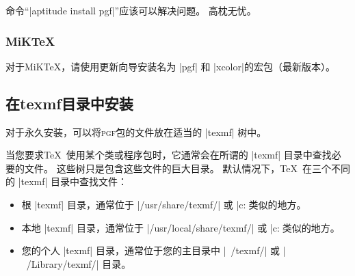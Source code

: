 命令``|aptitude install pgf|''应该可以解决问题。 高枕无忧。


\subsubsection{MiKTeX}


对于MiK\TeX，请使用更新向导安装名为 |pgf| 和 |xcolor|的宏包（最新版本）。

\subsection{在texmf目录中安装}


对于永久安装，可以将\textsc{pgf}包的文件放在适当的 |texmf| 树中。


当您要求\TeX\ 使用某个类或程序包时，它通常会在所谓的 |texmf| 目录中查找必要的文件。 这些树只是包含这些文件的巨大目录。 默认情况下，\TeX\ 在三个不同的 |texmf| 目录中查找文件：

%
\begin{itemize}
    \item 根 |texmf| 目录，通常位于 |/usr/share/texmf/| 或 |c:\texmf\| 或类似的地方。
    \item 本地 |texmf| 目录，通常位于 |/usr/local/share/texmf/| 或 |c:\localtexmf\| 或类似的地方。
    \item 您的个人 |texmf| 目录，通常位于您的主目录中 |~/texmf/| 或 |~/Library/texmf/| 目录。
\end{itemize}

